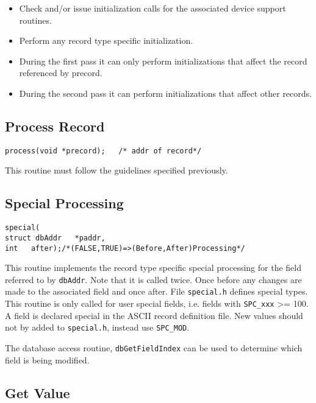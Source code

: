 \begin{itemize}\item Check and/or issue initialization calls for the associated device support routines.

\item Perform any record type specific initialization.

\item During the first pass it can only perform initializations that affect the record referenced by precord. 

\item During the second pass it can perform initializations that affect other records.

\end{itemize}\subsection{Process Record}

\begin{verbatim}process(void *precord);   /* addr of record*/
\end{verbatim}This routine must follow the guidelines specified previously.

\subsection{Special Processing}

\begin{verbatim}special(
struct dbAddr   *paddr,
int   after);/*(FALSE,TRUE)=>(Before,After)Processing*/
\end{verbatim}This routine implements the record type specific special processing for the field referred to by \verb|dbAddr|. Note that it is 
called twice. Once before any changes are made to the associated field and once after. File \verb|special.h| defines special 
types. This routine is only called for user special fields, i.e. fields with \verb|SPC_xxx| \textgreater{}= 100. A field is declared special in the 
ASCII record definition file. New values should not by added to \verb|special.h|, instead use \verb|SPC_MOD|.

The database access routine, \verb|dbGetFieldIndex| can be used to determine which field is being modified.

\subsection{Get Value}

